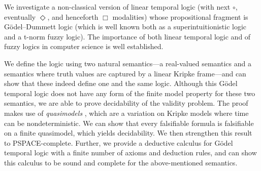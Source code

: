 \documentclass[bsl,meeting]{asl}
\def\urladdr#1{\endgraf\noindent{\it URL Address}: {\tt #1}.}
\newcommand{\NP}{}
\begin{document}
\thispagestyle{empty}


\NP  
{}
%
%
%


We investigate a non-classical version of linear temporal
logic (with next $\circ$, eventually $\Diamond$, and henceforth $\Box$ modalities) whose propositional fragment is G\"odel--Dummett logic
(which is well known both as a superintuitionistic logic and
a t-norm fuzzy logic). The importance of both linear temporal logic and of fuzzy logics in computer science is well established. 

We define the logic using two natural
semantics---a real-valued semantics and a semantics where truth values are captured by a linear Kripke frame---and can show that these indeed define one and the same
logic. Although this G\"odel temporal logic does not have any
form of the finite model property for these two semantics, we are able to prove decidability of the validity problem. The proof makes use of \emph{quasimodels} \cite{cite1}, which are a variation on Kripke models where time can be nondeterministic. We can show that every falsifiable formula is falsifiable on a finite
quasimodel, which yields decidability. We then
strengthen this result to PSPACE-complete. Further, we provide a deductive calculus for G\"odel temporal logic with a finite number of axioms and deduction rules, and can show this calculus to be sound and
complete for the above-mentioned semantics.
\end{document}
